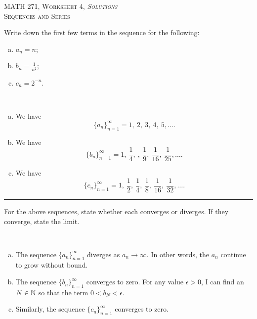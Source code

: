 \documentclass[12pt]{article} %
\begin{document}
\begin{center}
   \textsc{\large MATH 271, Worksheet 4, \emph{Solutions}}\\
   \textsc{Sequences and Series}
\end{center}
\vspace{.5cm}

\begin{problem}
Write down the first few terms in the sequence for the following:
\begin{enumerate}[(a)]
    \item $a_n = n$;
    \item $b_n = \frac{1}{n^2}$;
    \item $c_n = 2^{-n}$.
\end{enumerate}
\end{problem}
\begin{solution}~
\begin{enumerate}[(a)]
    \item We have
    \[
    \{a_n\}_{n=1}^\infty = 1,~2,~3,~4,~5,\dots.
    \]
    \item We have
    \[
    \{b_n\}_{n=1}^\infty = 1,~\frac{1}{4},~,~\frac{1}{9},~\frac{1}{16},~\frac{1}{25},\dots.
    \]
    \item We have
    \[
    \{c_n\}_{n=1}^\infty = 1,~\frac{1}{2},~\frac{1}{4},~\frac{1}{8},~\frac{1}{16},~\frac{1}{32},\dots.
    \]
\end{enumerate}
\end{solution}

\hrule
\begin{problem}
For the above sequences, state whether each converges or diverges.  If they converge, state the limit.
\end{problem}
\begin{solution}~
\begin{enumerate}[(a)]
    \item The sequence $\{a_n\}_{n=1}^\infty$ diverges as $a_n \to \infty$. In other words, the $a_n$ continue to grow without bound.
    \item The sequence $\{b_n\}_{n=1}^\infty$ converges to zero.  For any value $\epsilon>0$, I can find an $N\in \mathbb{N}$ so that the term $0<b_N<\epsilon$.
    \item Similarly, the sequence $\{c_n\}_{n=1}^\infty$ converges to zero.
\end{enumerate}
\end{solution}
\end{document}
